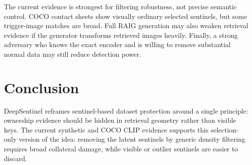 \documentclass[letterpaper]{article}
\begin{document}
The current evidence is strongest for filtering robustness, not precise semantic
control. COCO contact sheets show visually ordinary selected sentinels, but some
trigger-image matches are broad. Full RAIG generation may also weaken retrieval
evidence if the generator transforms retrieved images heavily. Finally, a strong
adversary who knows the exact encoder and is willing to remove substantial
normal data may still reduce detection power.

\section{Conclusion}

DeepSentinel reframes sentinel-based dataset protection around a single
principle: ownership evidence should be hidden in retrieval geometry rather than
visible keys. The current synthetic and COCO CLIP evidence supports this
selection-only version of the idea: removing the latent sentinels by generic
density filtering requires broad collateral damage, while visible or outlier
sentinels are easier to discard.


\end{document}
